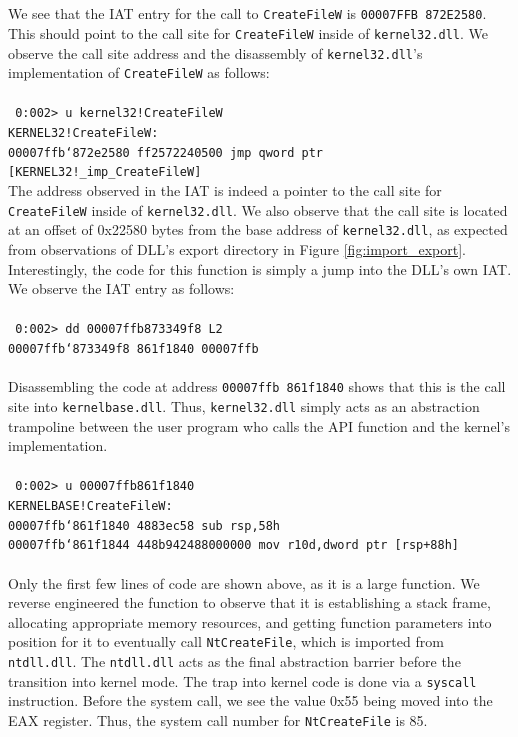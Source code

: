\documentclass[preprint,12pt]{elsarticle}
\begin{document}
\\\\We see that the IAT entry for the call to \texttt{CreateFileW} is \texttt{00007FFB 872E2580}. This should point to the call site for \texttt{CreateFileW} inside of \texttt{kernel32.dll}. We observe the call site address and the disassembly of \texttt{kernel32.dll}'s implementation of \texttt{CreateFileW} as follows:\\\\
{\footnotesize{\texttt{
0:002> u kernel32!CreateFileW\\
KERNEL32!CreateFileW:\\
00007ffb`872e2580 ff2572240500  jmp qword ptr [KERNEL32!\_imp\_CreateFileW]
}}}
\\The address observed in the IAT is indeed a pointer to the call site for \texttt{CreateFileW} inside of \texttt{kernel32.dll}. We also observe that the call site is located at an offset of 0x22580 bytes from the base address of \texttt{kernel32.dll}, as expected from observations of DLL's export directory in Figure \ref{fig:import_export}. Interestingly, the code for this function is simply a jump into the DLL's own IAT. We observe the IAT entry as follows:\\\\
{\footnotesize{\texttt{
0:002> dd 00007ffb873349f8 L2\\
00007ffb`873349f8  861f1840 00007ffb
}}}
\\\\Disassembling the code at address \texttt{00007ffb 861f1840} shows that this is the call site into \texttt{kernelbase.dll}. Thus, \texttt{kernel32.dll} simply acts as an abstraction trampoline between the user program who calls the API function and the kernel's implementation.\\\\
{\footnotesize{\texttt{
0:002> u 00007ffb861f1840\\
KERNELBASE!CreateFileW:\\
00007ffb`861f1840 4883ec58  sub rsp,58h\\
00007ffb`861f1844 448b942488000000 mov     r10d,dword ptr [rsp+88h]
}}}
\\\\Only the first few lines of code are shown above, as it is a large function. We reverse engineered the function to observe that it is establishing a stack frame, allocating appropriate memory resources, and getting function parameters into position for it to eventually call \texttt{NtCreateFile}, which is imported from \texttt{ntdll.dll}. The \texttt{ntdll.dll} acts as the final abstraction barrier before the transition into kernel mode. The trap into kernel code is done via a \texttt{syscall} instruction. Before the system call, we see the value 0x55 being moved into the EAX register. Thus, the system call number for \texttt{NtCreateFile} is 85.\\\\
\end{document}
